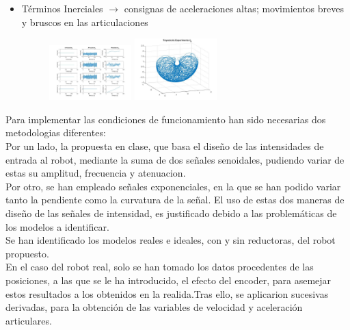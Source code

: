 \begin{itemize}
\newpage
		\item Términos Inerciales $ \rightarrow $ consignas de aceleraciones altas; movimientos breves y bruscos en las articulaciones
		\begin{figure}[h]
			\centering
			\includegraphics[width=0.3\textwidth]{graftheta8}
			\includegraphics[width=0.3\textwidth]{Traytheta8}
		\end{figure}
	\end{itemize}

	Para implementar las condiciones de funcionamiento han sido necesarias dos metodologias diferentes:\\

Por un lado, la propuesta en clase, que basa el diseño de las intensidades de entrada al robot, mediante la suma de dos señales senoidales, pudiendo variar de estas su amplitud, frecuencia y atenuacion.\\
Por otro, se han empleado señales exponenciales, en la que se han podido variar tanto la pendiente como la curvatura de la señal.	El uso de estas dos maneras de diseño de las señales de intensidad, es justificado debido a las problemáticas
de los modelos a identificar.\\

Se han identificado los modelos reales e ideales, con y sin reductoras, del robot propuesto.\\
En el caso del robot real, solo se han tomado los datos procedentes de las posiciones, a las que se le ha introducido, el efecto del encoder, para asemejar estos resultados a los obtenidos en la realida.Tras ello, se aplicarion sucesivas derivadas, para la obtención de las variables de velocidad y aceleración articulares.\\

